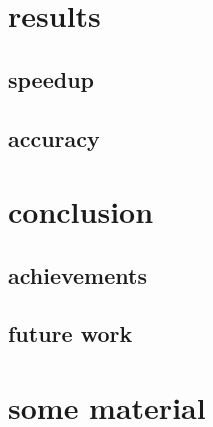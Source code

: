 \documentclass[mscthesis]{usiinfthesis}
\begin{document}
\chapter{results}
\label{ch:res}
\section{speedup}
\label{ch:res_speed}
\section{accuracy}
\label{ch:res_prec}

\chapter{conclusion}
\label{ch:conc}

\section{achievements}
\label{ch:conc_ach}

\section{future work}
\label{ch:conc_work}

\nocite{*}

\appendix %

\chapter{some material}
\end{document}
